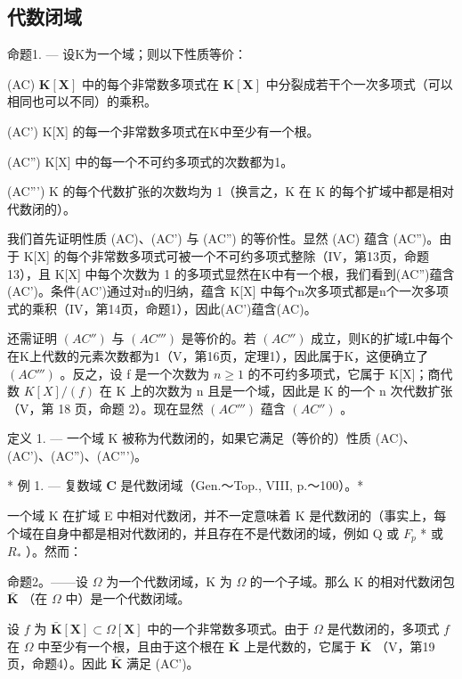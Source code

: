 \subsection{代数闭域}

命题1. --- 设K为一个域；则以下性质等价：

(AC) \(\mathbf{K}[\mathbf{X}]\) 中的每个非常数多项式在 \(\mathbf{K}[\mathbf{X}]\) 中分裂成若干个一次多项式（可以相同也可以不同）的乘积。

(AC') K{[}X{]} 的每一个非常数多项式在K中至少有一个根。

(AC'') K{[}X{]} 中的每一个不可约多项式的次数都为1。

(AC''') K 的每个代数扩张的次数均为 1（换言之，K 在 K 的每个扩域中都是相对代数闭的）。

我们首先证明性质 (AC)、(AC') 与 (AC'') 的等价性。显然 (AC) 蕴含 (AC'')。由于 K{[}X{]} 的每个非常数多项式可被一个不可约多项式整除（IV，第13页，命题13），且 K{[}X{]} 中每个次数为 1 的多项式显然在K中有一个根，我们看到(AC'')蕴含(AC')。条件(AC')通过对n的归纳，蕴含 K{[}X{]} 中每个n次多项式都是n个一次多项式的乘积（IV，第14页，命题1），因此(AC')蕴含(AC)。

还需证明 \((AC'')\) 与 \((AC''')\) 是等价的。若 \((AC'')\) 成立，则K的扩域L中每个在K上代数的元素次数都为1（V，第16页，定理1），因此属于K，这便确立了 \((AC''')\) 。反之，设 f 是一个次数为 \(n \geqslant 1\) 的不可约多项式，它属于 K{[}X{]}；商代数 \(K[X]/(f)\) 在 K 上的次数为 n 且是一个域，因此是 K 的一个 n 次代数扩张（V，第 18 页，命题 2）。现在显然 \((AC''')\) 蕴含 \((AC'')\) 。

定义 1. --- 一个域 K 被称为代数闭的，如果它满足（等价的）性质 (AC)、(AC')、(AC'')、(AC''')。

* 例 1. --- 复数域 \(\mathbf{C}\) 是代数闭域（Gen.～Top., VIII, p.～100）。*

一个域 K 在扩域 E 中相对代数闭，并不一定意味着 K 是代数闭的（事实上，每个域在自身中都是相对代数闭的，并且存在不是代数闭的域，例如 Q 或 \(F_{p}\) * 或 \(R_{*}\) ）。然而：

命题2。——设 \(\Omega\) 为一个代数闭域，K 为 \(\Omega\) 的一个子域。那么 K 的相对代数闭包 \(\bar{\mathbf{K}}\) （在 \(\Omega\) 中）是一个代数闭域。

设 \(f\) 为 \(\bar{\mathbf{K}}[\mathbf{X}] \subset \Omega[\mathbf{X}]\) 中的一个非常数多项式。由于 \(\Omega\) 是代数闭的，多项式 \(f\) 在 \(\Omega\) 中至少有一个根，且由于这个根在 \(\bar{\mathbf{K}}\) 上是代数的，它属于 \(\bar{\mathbf{K}}\) （V，第19页，命题4）。因此 \(\bar{\mathbf{K}}\) 满足 (AC')。

